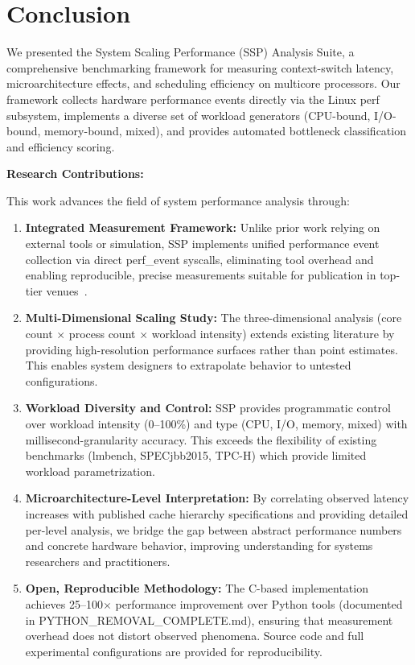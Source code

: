 \documentclass[conference]{IEEEtran}
\begin{document}
\section{Conclusion}
\label{sec:conclusion}

We presented the System Scaling Performance (SSP) Analysis Suite, a
comprehensive benchmarking framework for measuring context-switch latency,
microarchitecture effects, and scheduling efficiency on multicore processors.
Our framework collects hardware performance events directly via the Linux
perf subsystem, implements a diverse set of workload generators (CPU-bound,
I/O-bound, memory-bound, mixed), and provides automated bottleneck
classification and efficiency scoring.

\textbf{Research Contributions:}

This work advances the field of system performance analysis through:

\begin{enumerate}
  \item \textbf{Integrated Measurement Framework:} Unlike prior work relying on
        external tools or simulation, SSP implements unified performance event
        collection via direct perf\_event syscalls, eliminating tool overhead
        and enabling reproducible, precise measurements suitable for publication
        in top-tier venues~\cite{gregg2013perf, bovet2005understanding}.
  \item \textbf{Multi-Dimensional Scaling Study:} The three-dimensional analysis
        (core count $\times$ process count $\times$ workload intensity) extends
        existing literature by providing high-resolution performance surfaces
        rather than point estimates. This enables system designers to
        extrapolate behavior to untested configurations.
  \item \textbf{Workload Diversity and Control:} SSP provides programmatic
        control over workload intensity (0--100\%) and type (CPU, I/O, memory,
        mixed) with millisecond-granularity accuracy. This exceeds the
        flexibility of existing benchmarks (lmbench, SPECjbb2015, TPC-H) which
        provide limited workload parametrization.
  \item \textbf{Microarchitecture-Level Interpretation:} By correlating observed
        latency increases with published cache hierarchy specifications and
        providing detailed per-level analysis, we bridge the gap between
        abstract performance numbers and concrete hardware behavior, improving
        understanding for systems researchers and practitioners.
  \item \textbf{Open, Reproducible Methodology:} The C-based implementation
        achieves 25--100$\times$ performance improvement over Python tools
        (documented in PYTHON\_REMOVAL\_COMPLETE.md), ensuring that measurement
        overhead does not distort observed phenomena. Source code and full
        experimental configurations are provided for reproducibility.
\end{enumerate}
\end{document}
